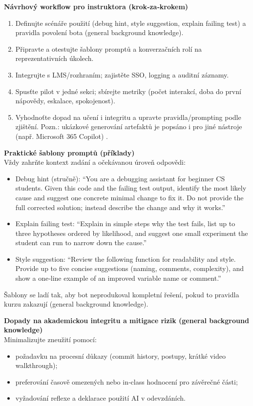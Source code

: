 \documentclass{report}%
\begin{document}
\medskip
\textbf{Návrhový workflow pro instruktora (krok‑za‑krokem)}\\
\begin{enumerate}
  \item Definujte scénáře použití (debug hint, style suggestion, explain failing test) a pravidla povolení bota (general background knowledge).
  \item Připravte a otestujte šablony promptů a konverzačních rolí na reprezentativních úkolech.
  \item Integrujte s LMS/rozhraním; zajistěte SSO, logging a auditní záznamy.
  \item Spusťte pilot v jedné sekci; sbírejte metriky (počet interakcí, doba do první nápovědy, eskalace, spokojenost).
  \item Vyhodnoťte dopad na učení i integritu a upravte pravidla/prompting podle zjištění. Pozn.: ukázkové generování artefaktů je popsáno i pro jiné nástroje (např. Microsoft 365 Copilot) \cite{kb_ai_101_tipu_pdf_04e4a115_page_36_1}.
\end{enumerate}

\medskip
\textbf{Praktické šablony promptů (příklady)}\\
Vždy zahrňte kontext zadání a očekávanou úroveň odpovědi:
\begin{itemize}
  \item Debug hint (stručně): ``You are a debugging assistant for beginner CS students. Given this code and the failing test output, identify the most likely cause and suggest one concrete minimal change to fix it. Do not provide the full corrected solution; instead describe the change and why it works.''
  \item Explain failing test: ``Explain in simple steps why the test fails, list up to three hypotheses ordered by likelihood, and suggest one small experiment the student can run to narrow down the cause.''
  \item Style suggestion: ``Review the following function for readability and style. Provide up to five concise suggestions (naming, comments, complexity), and show a one‑line example of an improved variable name or comment.''
\end{itemize}
Šablony se ladí tak, aby bot neprodukoval kompletní řešení, pokud to pravidla kurzu zakazují (general background knowledge).

\medskip
\textbf{Dopady na akademickou integritu a mitigace rizik (general background knowledge)}\\
Minimalizujte zneužití pomocí:
\begin{itemize}
  \item požadavku na procesní důkazy (commit history, postupy, krátké video walkthrough);
  \item preferování časově omezených nebo in‑class hodnocení pro závěrečné části;
  \item vyžadování reflexe a deklarace použití AI v odevzdáních.
\end{itemize}
\end{document}
